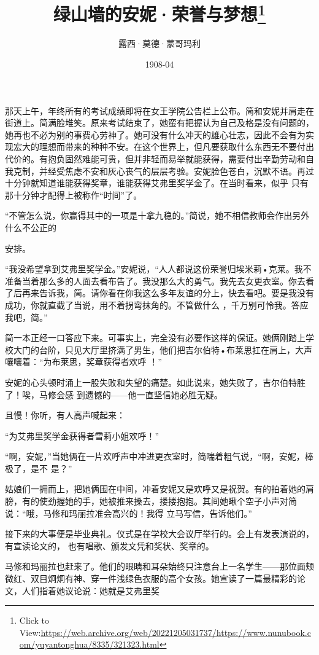 \documentclass{article}
\title{绿山墙的安妮·荣誉与梦想\footnote{Click to View:\url{https://web.archive.org/web/20221205031737/https://www.nunubook.com/yuyantonghua/8335/321323.html}}}
\author{露西·莫德·蒙哥玛利}
\date{1908-04}
\begin{document}

\maketitle


\Large

﻿那天上午，年终所有的考试成绩即将在女王学院公告栏上公布。简和安妮并肩走在街道上。简满脸堆笑。原来考试结束了，她蛮有把握认为自己及格是没有问题的，她再也不必为别的事费心劳神了。她可没有什么冲天的雄心壮志，因此不会有为实现宏大的理想而带来的种种不安。在这个世界上，但凡要获取什么东西无不要付出代价的。有抱负固然难能可贵，但并非轻而易举就能获得，需要付出辛勤劳动和自我克制，并经受焦虑不安和灰心丧气的层层考验。安妮脸色苍白，沉默不语。再过十分钟就知道谁能获得奖章，谁能获得艾弗里奖学金了。在当时看来，似乎
只有那十分钟才配得上被称作“时间”了。 

“不管怎么说，你赢得其中的一项是十拿九稳的。”简说，她不相信教师会作出另外什么不公正的
\newpage

安排。 

“我没希望拿到艾弗里奖学金。”安妮说，“人人都说这份荣誉归埃米莉•克莱。我不准备当着那么多的人面去看布告了。我没那么大的勇气。我先去女更衣室。你去看了后再来告诉我，简。请你看在你我这么多年友谊的分上，快去看吧。要是我没有成功，你就直截了当说，用不着拐弯抹角的。不管做什么
，千万别可怜我。答应我吧，简。” 

简一本正经一口答应下来。可事实上，完全没有必要作这样的保证。她俩刚踏上学校大门的台阶，只见大厅里挤满了男生，他们把吉尔伯特•布莱思扛在肩上，大声嚷嚷着：“为布莱思，奖章获得者欢呼
！” 

安妮的心头顿时涌上一股失败和失望的痛楚。如此说来，她失败了，吉尔伯特胜了！唉，马修会感
到遗憾的——他一直坚信她必胜无疑。 


\newpage

且慢！你听，有人高声喊起来： 


“为艾弗里奖学金获得者雪莉小姐欢呼！” 

“啊，安妮，”当她俩在一片欢呼声中冲进更衣室时，简喘着粗气说，“啊，安妮，棒极了，是不
是？” 

姑娘们一拥而上，把她俩围在中间，冲着安妮又是欢呼又是祝贺。有的拍着她的肩膀，有的使劲握她的手，她被推来搡去，搂搂抱抱。其间她瞅个空子小声对简说：“哦，马修和玛丽拉准会高兴的！我得
立马写信，告诉他们。” 

接下来的大事便是毕业典礼。仪式是在学校大会议厅举行的。会上有发表演说的，有宣读论文的，
也有唱歌、颁发文凭和奖状、奖章的。 

马修和玛丽拉也赶来了。他们的眼睛和耳朵始终只注意台上一名学生——那位面颊微红、双目炯炯有神、穿一件浅绿色衣服的高个女孩。她宣读了一篇最精彩的论文，人们指着她议论说：她就是艾弗里奖
\newpage
\end{document}
